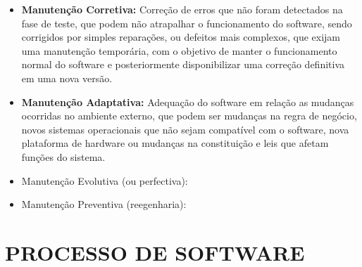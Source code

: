 \begin{itemize}
    \item \textbf{Manutenção Corretiva:} Correção de erros que não foram detectados na fase de teste, que podem não atrapalhar o funcionamento do software, sendo corrigidos por simples reparações, ou defeitos mais complexos, que exijam uma manutenção temporária, com o objetivo de manter o funcionamento normal do software e posteriormente disponibilizar uma correção definitiva em uma nova versão. 
\end{itemize}
    
\begin{itemize}  
    \item \textbf{Manutenção Adaptativa:} Adequação do software em relação as mudanças ocorridas no ambiente externo, que podem ser mudanças na regra de negócio, novos sistemas operacionais que não sejam compatível com o software, nova plataforma de hardware ou mudanças na constituição e leis que afetam funções do sistema.
\end{itemize}
    
 \begin{itemize}  
    \item Manutenção Evolutiva (ou perfectiva):
\end{itemize}
    
\begin{itemize}  
    \item Manutenção Preventiva (reegenharia):
\end{itemize}
    








\section{PROCESSO DE SOFTWARE}
\label{sec:processoDeSoftware}
